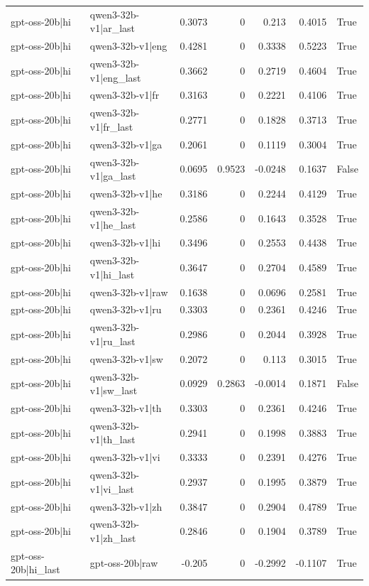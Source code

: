 \begin{table}
\begin{tabular}{l l r r r r l}
gpt-oss-20b|hi & qwen3-32b-v1|ar_last & 0.3073 & 0 & 0.213 & 0.4015 & True \\
gpt-oss-20b|hi & qwen3-32b-v1|eng & 0.4281 & 0 & 0.3338 & 0.5223 & True \\
gpt-oss-20b|hi & qwen3-32b-v1|eng_last & 0.3662 & 0 & 0.2719 & 0.4604 & True \\
gpt-oss-20b|hi & qwen3-32b-v1|fr & 0.3163 & 0 & 0.2221 & 0.4106 & True \\
gpt-oss-20b|hi & qwen3-32b-v1|fr_last & 0.2771 & 0 & 0.1828 & 0.3713 & True \\
gpt-oss-20b|hi & qwen3-32b-v1|ga & 0.2061 & 0 & 0.1119 & 0.3004 & True \\
gpt-oss-20b|hi & qwen3-32b-v1|ga_last & 0.0695 & 0.9523 & -0.0248 & 0.1637 & False \\
gpt-oss-20b|hi & qwen3-32b-v1|he & 0.3186 & 0 & 0.2244 & 0.4129 & True \\
gpt-oss-20b|hi & qwen3-32b-v1|he_last & 0.2586 & 0 & 0.1643 & 0.3528 & True \\
gpt-oss-20b|hi & qwen3-32b-v1|hi & 0.3496 & 0 & 0.2553 & 0.4438 & True \\
gpt-oss-20b|hi & qwen3-32b-v1|hi_last & 0.3647 & 0 & 0.2704 & 0.4589 & True \\
gpt-oss-20b|hi & qwen3-32b-v1|raw & 0.1638 & 0 & 0.0696 & 0.2581 & True \\
gpt-oss-20b|hi & qwen3-32b-v1|ru & 0.3303 & 0 & 0.2361 & 0.4246 & True \\
gpt-oss-20b|hi & qwen3-32b-v1|ru_last & 0.2986 & 0 & 0.2044 & 0.3928 & True \\
gpt-oss-20b|hi & qwen3-32b-v1|sw & 0.2072 & 0 & 0.113 & 0.3015 & True \\
gpt-oss-20b|hi & qwen3-32b-v1|sw_last & 0.0929 & 0.2863 & -0.0014 & 0.1871 & False \\
gpt-oss-20b|hi & qwen3-32b-v1|th & 0.3303 & 0 & 0.2361 & 0.4246 & True \\
gpt-oss-20b|hi & qwen3-32b-v1|th_last & 0.2941 & 0 & 0.1998 & 0.3883 & True \\
gpt-oss-20b|hi & qwen3-32b-v1|vi & 0.3333 & 0 & 0.2391 & 0.4276 & True \\
gpt-oss-20b|hi & qwen3-32b-v1|vi_last & 0.2937 & 0 & 0.1995 & 0.3879 & True \\
gpt-oss-20b|hi & qwen3-32b-v1|zh & 0.3847 & 0 & 0.2904 & 0.4789 & True \\
gpt-oss-20b|hi & qwen3-32b-v1|zh_last & 0.2846 & 0 & 0.1904 & 0.3789 & True \\
gpt-oss-20b|hi_last & gpt-oss-20b|raw & -0.205 & 0 & -0.2992 & -0.1107 & True \\

\end{tabular}
\end{table}
